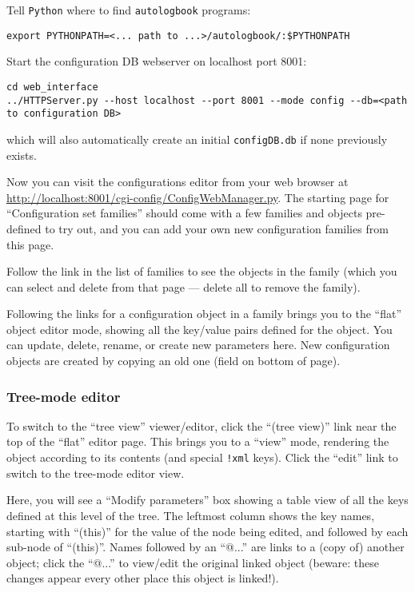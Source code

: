 \documentclass[12pt,english]{article}
\newcommand{\cd}[1]{\texttt{#1}}
\begin{document}
Tell \cd{Python} where to find \cd{autologbook} programs:
\begin{verbatim}
export PYTHONPATH=<... path to ...>/autologbook/:$PYTHONPATH
\end{verbatim}
Start the configuration DB webserver on localhost port 8001:
\begin{verbatim}
cd web_interface
../HTTPServer.py --host localhost --port 8001 --mode config --db=<path to configuration DB>
\end{verbatim}
which will also automatically create an initial \cd{configDB.db} if none previously exists.

Now you can visit the configurations editor from your web browser at
	\url{http://localhost:8001/cgi-config/ConfigWebManager.py}.
The starting page for ``Configuration set families'' should come with a few families
	and objects pre-defined to try out,
	and you can add your own new configuration families from this page.

Follow the link in the list of families to see the objects in the family
	(which you can select and delete from that page --- delete all to remove the family).

Following the links for a configuration object in a family brings you to the ``flat'' object editor mode,
	showing all the key/value pairs defined for the object.
You can update, delete, rename, or create new parameters here.
New configuration objects are created by copying an old one (field on bottom of page).

%
\subsubsection{Tree-mode editor}

To switch to the ``tree view'' viewer/editor, click the ``(tree view)'' link near the top of the ``flat'' editor page.
This brings you to a ``view'' mode, rendering the object according to its contents (and special \cd{!xml} keys).
Click the ``edit'' link to switch to the tree-mode editor view.

Here, you will see a ``Modify parameters'' box showing a table view of all the keys defined
	at this level of the tree.
The leftmost column shows the key names, starting with ``(this)'' for the value of the node being edited,
	and followed by each sub-node of ``(this)''.
Names followed by an ``@...'' are links to a (copy of) another object;
	click the ``@...'' to view/edit the original linked object (beware: these changes appear every other place this object is linked!).
\end{document}
